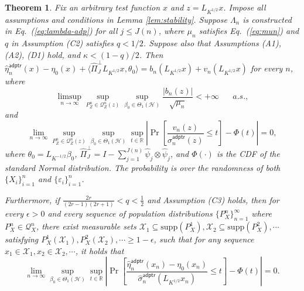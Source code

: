 \documentclass[aos]{imsart}
\renewcommand{\hat}{\widehat}
\newcommand{\supp}{\mathrm{supp}}
\newcommand{\mX}{\mathcal X}
\newcommand{\mH}{\mathcal H}
\newcommand{\adptr}{\mathsf{adptr}}
\theoremstyle{plain}
\newtheorem{theorem}{Theorem}[section]
\theoremstyle{definition}
\theoremstyle{definition}
\begin{document}
\begin{theorem}
Fix an arbitrary test function $x$ and $z=L_{K^{1/2}}x$.
Impose all assumptions and conditions in Lemma \ref{lem:stability}. Suppose $\Lambda_n$ is constructed in Eq.~(\ref{eq:lambda-adp}) for all $j\leq J(n)$,
where $\mu_n$ satisfies Eq.~(\ref{eq:mun}) and $q$ in Assumption (C2) satisfies $q<1/2$. Suppose also that Assumptions (A1), (A2), (D1) hold, and $\kappa<(1-q)/2$. Then 
$\hat\eta_n^\adptr(x)-\eta_0(x)+\langle\hat\Pi_J^\perp L_{K^{1/2}}x,\theta_0\rangle = b_n(L_{K^{1/2}}x)+v_n(L_{K^{1/2}}x)$ for every $n$, where
$$
\limsup_{n\to\infty}\sup_{P_Z^n\in\mathcal Q_Z^n(z)}\sup_{\beta_0\in\Theta_1(\mH)} \frac{|b_n(z)|}{\sqrt{\mu_n}} < +\infty\;\;\;\;\;\;a.s.,
$$
and
$$
\lim_{n\to\infty} \sup_{P_Z^n\in\mathcal Q_Z^n(z)}\sup_{\beta_0\in\Theta_1(\mH)}\sup_{t\in\mathbb R}\left|\Pr\left[\frac{v_n(z)}{\hat\sigma_n^\adptr(z)}\leq t\right] - \Phi(t)\right| = 0,
$$
where $\theta_0=L_{K^{-1/2}}\beta_0$, $\hat\Pi_J^\perp = I - \sum_{j=1}^{J(n)}\hat\psi_j\otimes\hat\psi_j$, and $\Phi(\cdot)$ is the CDF of the standard Normal distribution.
The probability is over the randomness of both $\{X_i\}_{i=1}^n$ and $\{\varepsilon_i\}_{i=1}^n$. 

Furthermore, if $\frac{2r}{(2r-1)(2r+1)}<q<\frac{1}{2}$ and Assumption (C3) holds, then for every $\epsilon>0$ and every sequence of population distributions $\{P_X^n\}_{n=1}^{\infty}$ where $P_X^n\in\mathcal Q_X^n$, there exist measurable sets $\mX_1\subseteq\supp(P_X^1),\mX_2\subseteq\supp(P_X^2),\cdots$ satisfying $P_X^1(\mX_1),P_X^2(\mX_2),\cdots\geq 1-\epsilon$,
such that for any sequence $x_1\in\mX_1,x_2\in\mX_2,\cdots$, it holds that
$$
\lim_{n\to\infty} \sup_{\beta_0\in\Theta_1(\mH)}\sup_{t\in\mathbb R}\left|\Pr\left[\frac{\hat\eta_n^\adptr(x_n)-\eta_0(x_n)}{\hat\sigma_n^\adptr(L_{K^{1/2}}x_n)}\leq t\right] - \Phi(t)\right| = 0.
$$
%
\label{thm:adptr-limiting}
\end{theorem}
\end{document}
